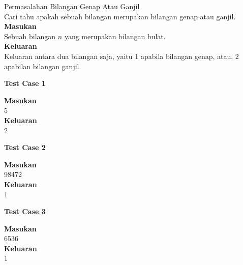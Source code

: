 \newpage
\begin{permasalahan}{Permasalahan Bilangan Genap Atau Ganjil}\\
	Cari tahu apakah sebuah bilangan merupakan bilangan genap atau ganjil.\\
	\textbf{Masukan}\\
	Sebuah bilangan $n$ yang merupakan bilangan bulat.\\
	\textbf{Keluaran}\\
	Keluaran antara dua bilangan saja, yaitu 1 apabila bilangan genap, atau, 2 apabilan bilangan ganjil.\\
	\begin{center}
	\textbf{Test Case 1}\\
	\end{center}
	\textbf{Masukan}\\
	5\\
	\textbf{Keluaran}\\
	2\\
	\begin{center}
	\textbf{Test Case 2}\\
	\end{center}
	\textbf{Masukan}\\
	98472\\
	\textbf{Keluaran}\\
	1\\
	\begin{center}
	\textbf{Test Case 3}\\
	\end{center}
	\textbf{Masukan}\\
	6536\\
	\textbf{Keluaran}\\
	1\\
\end{permasalahan}

